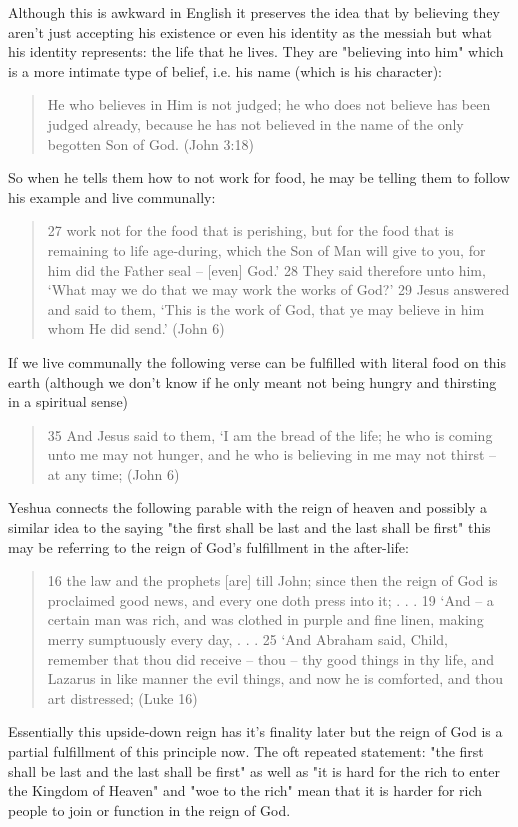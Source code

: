 \documentclass[11pt]{article}
\begin{document}
Although this is awkward in English it preserves the idea that by believing they aren't just accepting his existence or even his identity as the messiah but what his identity represents: the life that he lives. They are "believing into him" which is a more intimate type of belief, i.e. his name (which is his character): 
\begin{quote}
He who believes in Him is not judged; he who does not believe has been judged already, because he has not believed in the name of the only begotten Son of God. (John 3:18)
\end{quote}
 So when he tells them how to not work for food, he may be telling them to follow his example and live communally:
\begin{quote}
27 work not for the food that is perishing, but for the food that is remaining to life age-during, which the Son of Man will give to you, for him did the Father seal -- [even] God.' 28 They said therefore unto him, `What may we do that we may work the works of God?' 29 Jesus answered and said to them, `This is the work of God, that ye may believe in him whom He did send.' (John 6)
\end{quote}
If we live communally the following verse can be fulfilled with literal food on this earth (although we don't know if he only meant not being hungry and thirsting in a spiritual sense)
\begin{quote}
35 And Jesus said to them, `I am the bread of the life; he who is coming unto me may not hunger, and he who is believing in me may not thirst -- at any time; (John 6)
\end{quote}
Yeshua connects the following parable with the reign of heaven and possibly a similar idea to the saying "the first shall be last and the last shall be first" this may be referring to the reign of God's fulfillment in the after-life:
\begin{quote}
16 the law and the prophets [are] till John; since then the reign of God is proclaimed good news, and every one doth press into it; . . .
19 `And -- a certain man was rich, and was clothed in purple and fine linen, making merry sumptuously every day,
 . . . 
25 `And Abraham said, Child, remember that thou did receive -- thou -- thy good things in thy life, and Lazarus in like manner the evil things, and now he is comforted, and thou art distressed; (Luke 16) 
\end{quote}
Essentially this upside-down reign has it's finality later but the reign of God is a partial fulfillment of this principle now. The oft repeated statement: "the first shall be last and the last shall be first" as well as "it is hard for the rich to enter the Kingdom of Heaven" and "woe to the rich" mean that it is harder for rich people to join or function in the reign of God.
\end{document}
